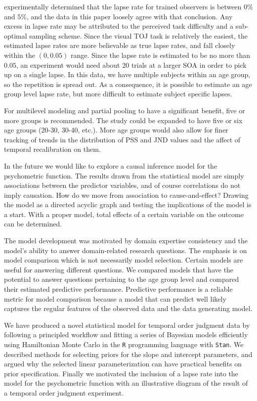 \documentclass[11pt, oneside, openany]{scrbook}
\begin{document}
\citet{wichmann2001a} experimentally determined that the lapse rate for trained observers is between \(0\%\) and \(5\%\), and the data in this paper loosely agree with that conclusion. Any excess in lapse rate may be attributed to the perceived task difficulty and a sub-optimal sampling scheme. Since the visual TOJ task is relatively the easiest, the estimated lapse rates are more believable as true lapse rates, and fall closely within the \((0, 0.05)\) range. Since the lapse rate is estimated to be no more than \(0.05\), an experiment would need about \(20\) trials at a larger SOA in order to pick up on a single lapse. In this data, we have multiple subjects within an age group, so the repetition is spread out. As a consequence, it is possible to estimate an age group level lapse rate, but more difficult to estimate subject specific lapses.

For multilevel modeling and partial pooling to have a significant benefit, five or more groups is recommended. The study could be expanded to have five or six age groups (20-30, 30-40, etc.). More age groups would also allow for finer tracking of trends in the distribution of PSS and JND values and the affect of temporal recalibration on them.

In the future we would like to explore a causal inference model for the psychometric function. The results drawn from the statistical model are simply associations between the predictor variables, and of course correlations do not imply causation. How do we move from association to cause-and-effect? Drawing the model as a directed acyclic graph and testing the implications of the model is a start. With a proper model, total effects of a certain variable on the outcome can be determined.

The model development was motivated by domain expertise consistency and the model's ability to answer domain-related research questions. The emphasis is on model comparison which is not necessarily model selection. Certain models are useful for answering different questions. We compared models that have the potential to answer questions pertaining to the age group level and compared their estimated predictive performance. Predictive performance is a reliable metric for model comparison because a model that can predict well likely captures the regular features of the observed data and the data generating model.

We have produced a novel statistical model for temporal order judgment data by following a principled workflow and fitting a series of Bayesian models efficiently using Hamiltonian Monte Carlo in the \texttt{R} programming language with \texttt{Stan}. We described methods for selecting priors for the slope and intercept parameters, and argued why the selected linear parameterization can have practical benefits on prior specification. Finally we motivated the inclusion of a lapse rate into the model for the psychometric function with an illustrative diagram of the result of a temporal order judgment experiment.
\end{document}
